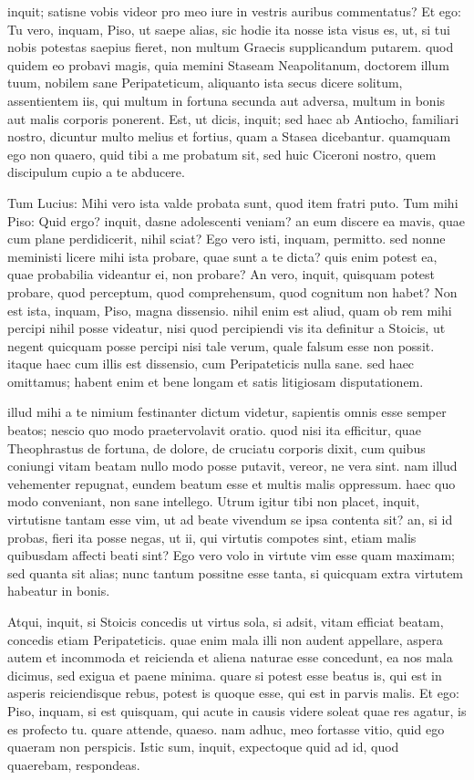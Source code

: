  inquit; satisne vobis videor pro meo iure in vestris auribus commentatus? Et ego: Tu vero, inquam, Piso, ut saepe alias, sic hodie ita nosse ista visus es, ut, si tui nobis potestas saepius fieret, non multum Graecis supplicandum putarem. quod quidem eo probavi magis, quia memini Staseam Neapolitanum, doctorem illum tuum, nobilem sane Peripateticum, aliquanto ista secus dicere solitum, assentientem iis, qui multum in fortuna secunda aut adversa, multum in bonis aut malis corporis ponerent. Est, ut dicis, inquit; sed haec ab Antiocho, familiari nostro, dicuntur multo melius et fortius, quam a Stasea dicebantur. quamquam ego non quaero, quid tibi a me probatum sit, sed huic Ciceroni nostro, quem discipulum cupio a te abducere.

 Tum Lucius: Mihi vero ista valde probata sunt, quod item fratri puto. Tum mihi Piso: Quid ergo? inquit, dasne adolescenti veniam? an eum discere ea mavis, quae cum plane perdidicerit, nihil sciat? Ego vero isti, inquam, permitto. sed nonne meministi licere mihi ista probare, quae sunt a te dicta? quis enim potest ea, quae probabilia videantur ei, non probare? An vero, inquit, quisquam potest probare, quod perceptum, quod comprehensum, quod cognitum non habet? Non est ista, inquam, Piso, magna dissensio. nihil enim est aliud, quam ob rem mihi percipi nihil posse videatur, nisi quod percipiendi vis ita definitur a Stoicis, ut negent quicquam posse percipi nisi tale verum, quale falsum esse non possit. itaque haec cum illis est dissensio, cum Peripateticis nulla sane. sed haec omittamus; habent enim et bene longam et satis litigiosam disputationem.

 illud mihi a te nimium festinanter dictum videtur, sapientis omnis esse semper beatos; nescio quo modo praetervolavit oratio. quod nisi ita efficitur, quae Theophrastus de fortuna, de dolore, de cruciatu corporis dixit, cum quibus coniungi vitam beatam nullo modo posse putavit, vereor, ne vera sint. nam illud vehementer repugnat, eundem beatum esse et multis malis oppressum. haec quo modo conveniant, non sane intellego. Utrum igitur tibi non placet, inquit, virtutisne tantam esse vim, ut ad beate vivendum se ipsa contenta sit? an, si id probas, fieri ita posse negas, ut ii, qui virtutis compotes sint, etiam malis quibusdam affecti beati sint? Ego vero volo in virtute vim esse quam maximam; sed quanta sit alias; nunc tantum possitne esse tanta, si quicquam extra virtutem habeatur in bonis.

 Atqui, inquit, si Stoicis concedis ut virtus sola, si adsit, vitam efficiat beatam, concedis etiam Peripateticis. quae enim mala illi non audent appellare, aspera autem et incommoda et reicienda et aliena naturae esse concedunt, ea nos mala dicimus, sed exigua et paene minima. quare si potest esse beatus is, qui est in asperis reiciendisque rebus, potest is quoque esse, qui est in parvis malis. Et ego: Piso, inquam, si est quisquam, qui acute in causis videre soleat quae res agatur, is es profecto tu. quare attende, quaeso. nam adhuc, meo fortasse vitio, quid ego quaeram non perspicis. Istic sum, inquit, expectoque quid ad id, quod quaerebam, respondeas.

